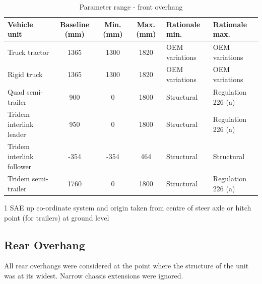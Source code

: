 \begin{table}[H]
	\centering\footnotesize
	\begin{threeparttable}

		\begin{tabulary}{\textwidth}{lcccll}
			\toprule
			\textbf{Vehicle unit} & \textbf{Baseline (mm)} & \textbf{Min. (mm)} & \textbf{Max. (mm)} & \textbf{Rationale min.} & \textbf{Rationale max.} \\
			\midrule
            Truck tractor & 1365  & 1300  & 1820  & OEM variations & OEM variations \\
            Rigid truck & 1365  & 1300  & 1820  & OEM variations & OEM variations \\
            Quad semi-trailer & 900   & 0     & 1800  & Structural & Regulation 226 (a) \\
            Tridem interlink leader & 950   & 0     & 1800  & Structural & Regulation 226 (a) \\
            Tridem interlink follower & -354  & -354  & 464   & Structural & Structural \\
            Tridem semi-trailer & 1760  & 0     & 1800  & Structural & Regulation 226 (a) \\
			\bottomrule
		\end{tabulary}

		\caption{Parameter range - front overhang}
		\label{table:parameter-range-front-overhang}

		\begin{tablenotes}
			\item[1] SAE up co-ordinate system and origin taken from centre of steer axle or hitch point (for trailers) at ground level
		\end{tablenotes}

	\end{threeparttable}
\end{table}

\subsection{Rear Overhang}\label{section:pr-rear-overhang}

All rear overhangs were considered at the point where the structure of the unit was at its widest. Narrow chassis extensions were ignored.

